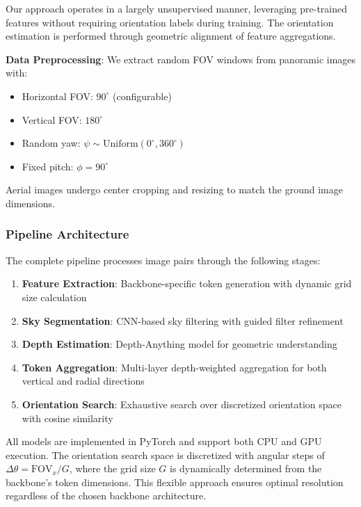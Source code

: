 Our approach operates in a largely unsupervised manner, leveraging pre-trained features without requiring orientation labels during training. The orientation estimation is performed through geometric alignment of feature aggregations.

\textbf{Data Preprocessing}: We extract random FOV windows from panoramic images with:
\begin{itemize}
    \item Horizontal FOV: $90^\circ$ (configurable)
    \item Vertical FOV: $180^\circ$ 
    \item Random yaw: $\psi \sim \text{Uniform}(0^\circ, 360^\circ)$
    \item Fixed pitch: $\phi = 90^\circ$
\end{itemize}

Aerial images undergo center cropping and resizing to match the ground image dimensions.

\subsubsection{Pipeline Architecture}

The complete pipeline processes image pairs through the following stages:
\begin{enumerate}
    \item \textbf{Feature Extraction}: Backbone-specific token generation with dynamic grid size calculation
    \item \textbf{Sky Segmentation}: CNN-based sky filtering with guided filter refinement
    \item \textbf{Depth Estimation}: Depth-Anything model for geometric understanding
    \item \textbf{Token Aggregation}: Multi-layer depth-weighted aggregation for both vertical and radial directions
    \item \textbf{Orientation Search}: Exhaustive search over discretized orientation space with cosine similarity
\end{enumerate}

All models are implemented in PyTorch and support both CPU and GPU execution. The orientation search space is discretized with angular steps of $\Delta\theta = \text{FOV}_x / G$, where the grid size $G$ is dynamically determined from the backbone's token dimensions. This flexible approach ensures optimal resolution regardless of the chosen backbone architecture.